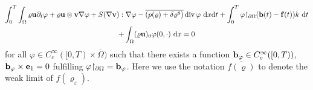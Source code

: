 \documentclass{article}
\DeclareMathOperator{\diver}{div}
\newcommand{\bb}{{\bf b}}
\newcommand{\vb}{\bb}
\newcommand{\be}{{\bf e}}
\newcommand{\ve}{\be}
\newcommand{\vf}{{\bf f}}
\newcommand{\bu}{{\bf u}}
\newcommand{\vu}{\bu}
\newcommand{\bv}{{\bf v}}
\newcommand{\vv}{\bv}
\newcommand{\pat}{\partial_t}
\numberwithin{equation}{section}
\begin{document}
\begin{multline}\label{eq.mom.befe}
\int_0^T \int_\Omega \varrho \vu \pat \varphi + \varrho \vu \otimes\vv \nabla\varphi + S(\nabla\vv):\nabla\varphi - \overline{(p(\varrho)+\delta\varrho^8)}\diver\varphi\ {\rm d}x{\rm d}t + \int_0^T  \varphi{\restriction_{\partial\Omega}}(\vb(t) - \vf(t)) k\ {\rm d}t \\
%
 + \int_\Omega (\varrho\vu)_0 \varphi(0,\cdot)\ {\rm d}x = 0
\end{multline}
for all $\varphi \in C^\infty_c([0,T)\times\overline\Omega)$ such that there exists a function $\vb_\varphi\in C^\infty_c([0,T))$, $\vb_\varphi \times \ve_1 = 0$ fulfilling $\varphi{\restriction_{\partial\Omega}} = \vb_\varphi$. Here we use the notation $\overline{f(\varrho)}$ to denote the weak limit of $f(\varrho_\varepsilon)$. 
\end{document}

